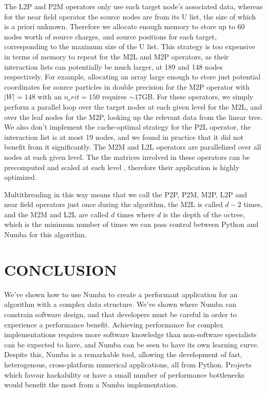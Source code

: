 \documentclass{IEEEcsmag}
\begin{document}
The L2P and P2M operators only use each target node's associated data, whereas for the near field operator the source nodes are from its U list, the size of which is a priori unknown. Therefore we allocate enough memory to store up to 60 nodes worth of source charges, and source positions for each target, corresponding to the maximum size of the U list. This strategy is too expensive in terms of memory to repeat for the M2L and M2P operators, as their interaction lists can potentially be much larger, at 189 and 148 nodes respectively. For example, allocating an array large enough to store just potential coordinates for source particles in double precision for the M2P operator with $|W|=148$ with an $n_crit=150$ requires $\sim 17$GB. For these operators, we simply perform a parallel loop over the target nodes at each given level for the M2L, and over the leaf nodes for the M2P, looking up the relevant data from the linear tree. We also don't implement the cache-optimal strategy for the P2L operator, the interaction list is at most 19 nodes, and we found in practice that it did not benefit from it significantly. The M2M and L2L operators are parallelized over all nodes at each given level. The the matrices involved in these operators can be precomputed and scaled at each level \cite{Wang2021}, therefore their application is highly optimized.

Multithreading in this way means that we call the P2P, P2M, M2P, L2P and near field operators just once during the algorithm, the M2L is called $d-2$ times, and the M2M and L2L are called $d$ times where $d$ is the depth of the octree, which is the minimum number of times we can pass control between Python and Numba for this algorithm.

\section{CONCLUSION}

We've shown how to use Numba to create a performant application for an algorithm with a complex data structure. We've shown where Numba can constrain software design, and that developers must be careful in order to experience a performance benefit. Achieving performance for complex implementations requires more software knowledge than non-software specialists can be expected to have, and Numba can be seen to have its own learning curve. Despite this, Numba is a remarkable tool, allowing the development of fast, heterogenous, cross-platform numerical applications, all from Python. Projects which favour hackability or have a small number of performance bottlenecks would benefit the most from a Numba implementation.
\end{document}
